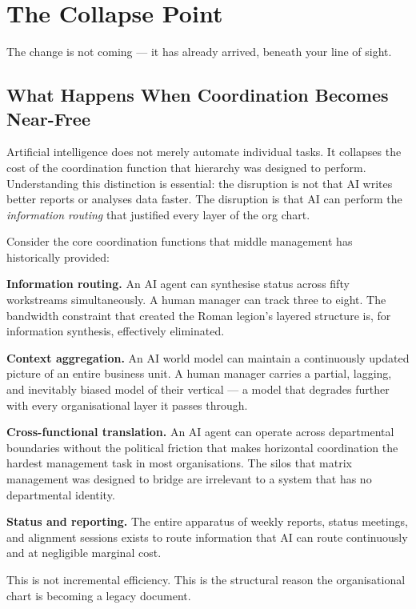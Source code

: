 \chapter{The Collapse Point}
\label{ch:collapse-point}

\epigraph{The change is not coming --- it has already arrived, beneath your line of sight.}{}

\section{What Happens When Coordination Becomes Near-Free}

Artificial intelligence does not merely automate individual tasks. It collapses the cost of the coordination function that hierarchy was designed to perform. Understanding this distinction is essential: the disruption is not that AI writes better reports or analyses data faster. The disruption is that AI can perform the \emph{information routing} that justified every layer of the org chart.

Consider the core coordination functions that middle management has historically provided:

\textbf{Information routing.} An AI agent can synthesise status across fifty workstreams simultaneously. A human manager can track three to eight. The bandwidth constraint that created the Roman legion's layered structure is, for information synthesis, effectively eliminated.

\textbf{Context aggregation.} An AI world model can maintain a continuously updated picture of an entire business unit. A human manager carries a partial, lagging, and inevitably biased model of their vertical --- a model that degrades further with every organisational layer it passes through.

\textbf{Cross-functional translation.} An AI agent can operate across departmental boundaries without the political friction that makes horizontal coordination the hardest management task in most organisations. The silos that matrix management was designed to bridge are irrelevant to a system that has no departmental identity.

\textbf{Status and reporting.} The entire apparatus of weekly reports, status meetings, and alignment sessions exists to route information that AI can route continuously and at negligible marginal cost.

This is not incremental efficiency. This is the structural reason the organisational chart is becoming a legacy document.

